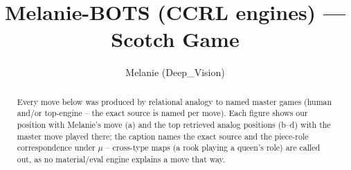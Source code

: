 \documentclass[11pt]{article}
\title{Melanie-BOTS (CCRL engines) — Scotch Game}
\author{Melanie (Deep\_Vision)}
\date{}
\begin{document}
\maketitle

\begin{abstract}Every move below was produced by relational analogy to named master games (human and/or top-engine -- the exact source is named per move). Each figure shows our position with Melanie's move (a) and the top retrieved analog positions (b--d) with the master move played there; the caption names the exact source and the piece-role correspondence under $\mu$ -- cross-type maps (a rook playing a queen's role) are called out, as no material/eval engine explains a move that way.\end{abstract}

\begin{figure}[p]\centering
\begin{subfigure}{0.46\textwidth}\centering
\resizebox{\linewidth}{!}{%
\newchessgame
\chessboard[
  setfen={r1b1kb1r/p1ppqppp/2p2n2/4P3/8/8/PPP2PPP/RNBQKB1R w KQkq - 1 7},
  showmover=false,
  pgfstyle=straightmove, color=movearrow, markmove={d1-e2}
]}
\caption{}
\end{subfigure}\hfill
\begin{subfigure}{0.46\textwidth}\centering
\resizebox{\linewidth}{!}{%
\newchessgame
\chessboard[
  setfen={r1b1kb1r/p1ppqppp/2p2n2/4P3/8/8/PPP2PPP/RNBQKB1R w KQkq - 1 7},
  showmover=false,
  pgfstyle=straightmove, color=movearrow, markmove={d1-e2}
]}
\caption{}
\end{subfigure}
\\[4pt]
\begin{subfigure}{0.46\textwidth}\centering
\resizebox{\linewidth}{!}{%
\newchessgame
\chessboard[
  setfen={r1b1kb1r/p1ppqppp/2p2n2/4P3/8/8/PPP2PPP/RNBQKB1R w KQkq - 1 7},
  showmover=false,
  pgfstyle=straightmove, color=movearrow, markmove={d1-e2}
]}
\caption{}
\end{subfigure}\hfill
\begin{subfigure}{0.46\textwidth}\centering
\resizebox{\linewidth}{!}{%
\newchessgame
\chessboard[
  setfen={r1b1kb1r/p1ppqppp/2p2n2/4P3/8/8/PPP2PPP/RNBQKB1R w KQkq - 1 7},
  showmover=false,
  pgfstyle=straightmove, color=movearrow, markmove={d1-e2}
]}
\caption{}
\end{subfigure}

\end{figure}
\end{document}
